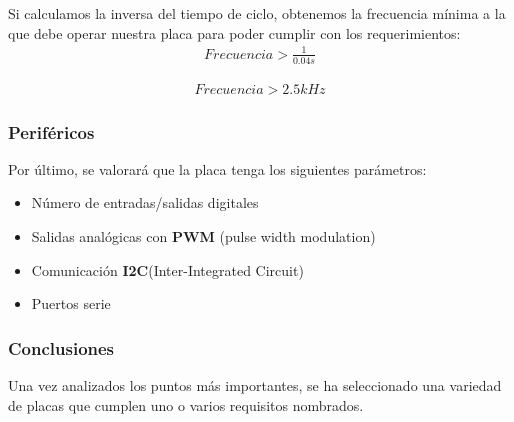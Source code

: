 Si calculamos la inversa del tiempo de ciclo, obtenemos la frecuencia mínima a la que debe operar nuestra placa para poder cumplir con los requerimientos:\newline
\begin{align*}
    Frecuencia > \frac{1}{0.04s}
\end{align*}

\begin{align*}
    Frecuencia > 2.5kHz
\end{align*}

\subsubsection{Periféricos}

Por último, se valorará que la placa tenga los siguientes parámetros:

\begin{itemize}
    \item Número de entradas/salidas digitales
    \item Salidas analógicas con \textbf{PWM} (pulse width modulation)
    \item Comunicación \textbf{I2C}(Inter-Integrated Circuit)
    \item Puertos serie
\end{itemize}



\subsubsection{Conclusiones}

Una vez analizados los puntos más importantes, se ha seleccionado una variedad de placas que cumplen uno o varios requisitos nombrados. 

